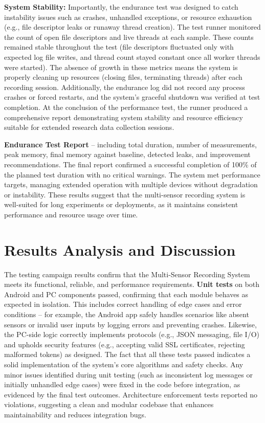 \textbf{System Stability:} Importantly, the endurance test was designed to catch instability issues such as crashes, unhandled exceptions, or resource exhaustion (e.g., file descriptor leaks or runaway thread creation). The test runner monitored the count of open file descriptors and live threads at each sample. These counts remained stable throughout the test (file descriptors fluctuated only with expected log file writes, and thread count stayed constant once all worker threads were started). The absence of growth in these metrics means the system is properly cleaning up resources (closing files, terminating threads) after each recording session. Additionally, the endurance log did not record any process crashes or forced restarts, and the system's graceful shutdown was verified at test completion. At the conclusion of the performance test, the runner produced a comprehensive report demonstrating system stability and resource efficiency suitable for extended research data collection sessions.

\textbf{Endurance Test Report} -- including total duration, number of measurements, peak memory, final memory against baseline, detected leaks, and improvement recommendations. The final report confirmed a successful completion of 100\% of the planned test duration with no critical warnings. The system met performance targets, managing extended operation with multiple devices without degradation or instability. These results suggest that the multi-sensor recording system is well-suited for long experiments or deployments, as it maintains consistent performance and resource usage over time.


\section{Results Analysis and Discussion}
The testing campaign results confirm that the Multi-Sensor Recording System meets its functional, reliable, and performance requirements. \textbf{Unit tests} on both Android and PC components passed, confirming that each module behaves as expected in isolation. This includes correct handling of edge cases and error conditions -- for example, the Android app safely handles scenarios like absent sensors or invalid user inputs by logging errors and preventing crashes. Likewise, the PC-side logic correctly implements protocols (e.g., JSON messaging, file I/O) and upholds security features (e.g., accepting valid SSL certificates, rejecting malformed tokens) as designed. The fact that all these tests passed indicates a solid implementation of the system's core algorithms and safety checks. Any minor issues identified during unit testing (such as inconsistent log messages or initially unhandled edge cases) were fixed in the code before integration, as evidenced by the final test outcomes. Architecture enforcement tests reported no violations, suggesting a clean and modular codebase that enhances maintainability and reduces integration bugs.

